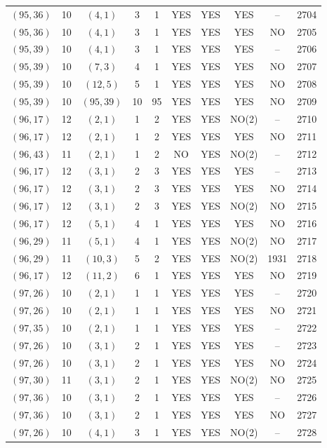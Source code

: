 \begin{longtable}{|c|c|c|c|c|c|c|c|c|c|}
$(95, 36)$ & 10 & $(4, 1)$ & 3 & 1 & YES & YES & YES & -- & 2704\\
$(95, 36)$ & 10 & $(4, 1)$ & 3 & 1 & YES & YES & YES & NO & 2705\\
$(95, 39)$ & 10 & $(4, 1)$ & 3 & 1 & YES & YES & YES & -- & 2706\\
$(95, 39)$ & 10 & $(7, 3)$ & 4 & 1 & YES & YES & YES & NO & 2707\\
$(95, 39)$ & 10 & $(12, 5)$ & 5 & 1 & YES & YES & YES & NO & 2708\\
$(95, 39)$ & 10 & $(95, 39)$ & 10 & 95 & YES & YES & YES & NO & 2709\\
$(96, 17)$ & 12 & $(2, 1)$ & 1 & 2 & YES & YES & NO(2) & -- & 2710\\
$(96, 17)$ & 12 & $(2, 1)$ & 1 & 2 & YES & YES & YES & NO & 2711\\
$(96, 43)$ & 11 & $(2, 1)$ & 1 & 2 & NO & YES & NO(2) & -- & 2712\\
$(96, 17)$ & 12 & $(3, 1)$ & 2 & 3 & YES & YES & YES & -- & 2713\\
$(96, 17)$ & 12 & $(3, 1)$ & 2 & 3 & YES & YES & YES & NO & 2714\\
$(96, 17)$ & 12 & $(3, 1)$ & 2 & 3 & YES & YES & NO(2) & NO & 2715\\
$(96, 17)$ & 12 & $(5, 1)$ & 4 & 1 & YES & YES & YES & NO & 2716\\
$(96, 29)$ & 11 & $(5, 1)$ & 4 & 1 & YES & YES & NO(2) & NO & 2717\\
$(96, 29)$ & 11 & $(10, 3)$ & 5 & 2 & YES & YES & NO(2) & 1931 & 2718\\
$(96, 17)$ & 12 & $(11, 2)$ & 6 & 1 & YES & YES & YES & NO & 2719\\
$(97, 26)$ & 10 & $(2, 1)$ & 1 & 1 & YES & YES & YES & -- & 2720\\
$(97, 26)$ & 10 & $(2, 1)$ & 1 & 1 & YES & YES & YES & NO & 2721\\
$(97, 35)$ & 10 & $(2, 1)$ & 1 & 1 & YES & YES & YES & -- & 2722\\
$(97, 26)$ & 10 & $(3, 1)$ & 2 & 1 & YES & YES & YES & -- & 2723\\
$(97, 26)$ & 10 & $(3, 1)$ & 2 & 1 & YES & YES & YES & NO & 2724\\
$(97, 30)$ & 11 & $(3, 1)$ & 2 & 1 & YES & YES & NO(2) & NO & 2725\\
$(97, 36)$ & 10 & $(3, 1)$ & 2 & 1 & YES & YES & YES & -- & 2726\\
$(97, 36)$ & 10 & $(3, 1)$ & 2 & 1 & YES & YES & YES & NO & 2727\\
$(97, 26)$ & 10 & $(4, 1)$ & 3 & 1 & YES & YES & NO(2) & -- & 2728\\

\end{longtable}

